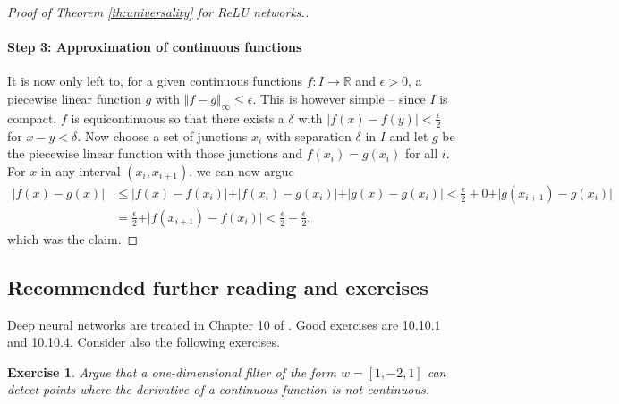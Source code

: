 \documentclass{article}
\newcommand{\R}{\mathbb{R}}
\newtheorem{exercise}{Exercise}
\newcommand{\abs}[1]{\vert #1 \vert}
\newcommand{\norm}[1]{\Vert #1 \Vert}
\begin{document}
\begin{proof}[Proof of Theorem \ref{th:universality} for ReLU networks.]
     \paragraph{Step 3: Approximation of continuous functions} It is now only left to, for a given continuous functions $f:I \to \R$ and $\epsilon>0$, a piecewise linear function $g$ with $\norm{f-g}_\infty \leq \epsilon$. This is however simple -- since $I$ is compact, $f$ is equicontinuous so that there exists a $\delta$ with $\abs{f(x)-f(y)}< \tfrac{\epsilon}{2}$ for $x-y<\delta$. Now choose a set of junctions $x_i$ with separation $\delta$ in $I$ and let $g$ be the piecewise linear function with those junctions and $f(x_i)=g(x_i)$ for all $i$. For $x$ in any interval $(x_i,x_{i+1})$, we can now argue
     \begin{align*}
         \abs{f(x)-g(x)} &\leq \abs{f(x)-f(x_i)} + \abs{f(x_i)-g(x_i)} + \abs{g(x)-g(x_i)} < \tfrac{\epsilon}{2} + 0 + \abs{g(x_{i+1})-g(x_i)} \\
         &= \tfrac{\epsilon}{2} + \abs{f(x_{i+1})-f(x_i)} < \tfrac{\epsilon}{2} + \tfrac{\epsilon}{2},
     \end{align*}
     which was the claim.
\end{proof}

\subsection{Recommended further reading and exercises} Deep neural networks are treated in Chapter 10 of \cite{james2023introduction}. Good exercises are 10.10.1 and 10.10.4. Consider also the following exercises.

\begin{exercise}
    Argue that a one-dimensional filter of the form $w = [1,-2,1]$ can detect points where the derivative of a continuous function is not continuous.
\end{exercise}
\end{document}
